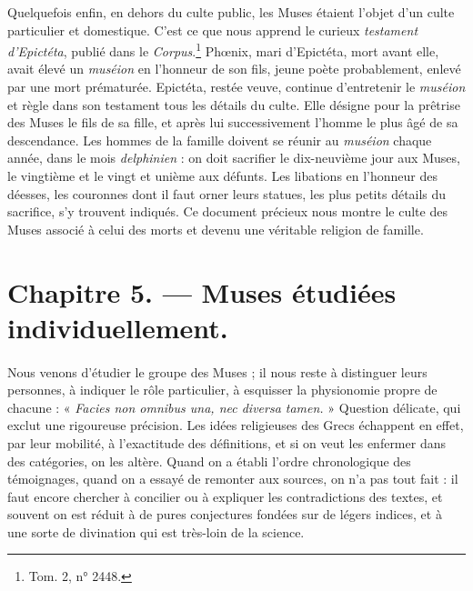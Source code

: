 \documentclass[landscape, a4paper, 11pt, oneside, polutonikogreek, french]{article}
\begin{document}
Quelquefois enfin, en dehors du culte public, les Muses étaient l'objet d'un culte particulier et domestique. C'est ce que nous apprend le curieux \emph{testament d'Epictéta}, publié dans le \emph{Corpus}.\footnote{Tom. 2, n° 2448.} Phœnix, mari d'Epictéta, mort avant elle, avait élevé un \emph{muséion} en l'honneur de son fils, jeune poète probablement, enlevé par une mort prématurée. Epictéta, restée veuve, continue d'entretenir le \emph{muséion} et règle dans son testament tous les détails du culte. Elle désigne pour la prêtrise des Muses le fils de sa fille, et après lui successivement l'homme le plus âgé de sa descendance. Les hommes de la famille doivent se réunir au \emph{muséion} chaque année, dans le mois \emph{delphinien} : on doit sacrifier le dix-neuvième jour aux Muses, le vingtième et le vingt et unième aux défunts. Les libations en l'honneur des déesses, les couronnes dont il faut orner leurs statues, les plus petits détails du sacrifice, s'y trouvent indiqués. Ce document précieux nous montre le culte des Muses associé à celui des morts et devenu une véritable religion de famille.
\clearpage
\section{Chapitre 5. --- Muses étudiées individuellement.}
\paragraph{}
Nous venons d'étudier le groupe des Muses ; il nous reste à distinguer leurs personnes, à indiquer le rôle particulier, à esquisser la physionomie propre de chacune : « \emph{Facies non omnibus una, nec diversa tamen.} » Question délicate, qui exclut une rigoureuse précision. Les idées religieuses des Grecs échappent en effet, par leur mobilité, à l'exactitude des définitions, et si on veut les enfermer dans des catégories, on les altère. Quand on a établi l'ordre chronologique des témoignages, quand on a essayé de remonter aux sources, on n'a pas tout fait : il faut encore chercher à concilier ou à expliquer les contradictions des textes, et souvent on est réduit à de pures conjectures fondées sur de légers indices, et à une sorte de divination qui est très-loin de la science.
\end{document}
